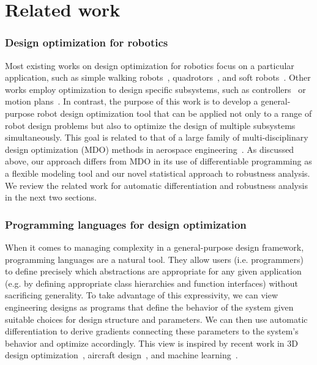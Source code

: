 \section{Related work}\label{ch:rss:related_work}

\subsubsection{Design optimization for robotics}

Most existing works on design optimization for robotics focus on a particular application, such as simple walking robots~\cite{Schulz_robogami}, quadrotors~\cite{du2016computational}, and soft robots~\cite{soft_robot_optimization_review,du2021underwater,ma2021diffaqua}. Other works employ optimization to design specific subsystems, such as controllers~\cite{xu_uav_controllers} or motion plans~\cite{schulmanMotionPlanningSequential2014}.
In contrast, the purpose of this work is to develop a general-purpose robot design optimization tool that can be applied not only to a range of robot design problems but also to optimize the design of multiple subsystems simultaneously. This goal is related to that of a large family of multi-disciplinary design optimization (MDO) methods in aerospace engineering~\cite{Martins2013_mdo_survey}. As discussed above, our approach differs from MDO in its use of differentiable programming as a flexible modeling tool and our novel statistical approach to robustness analysis. We review the related work for automatic differentiation and robustness analysis in the next two sections.

\subsubsection{Programming languages for design optimization}

When it comes to managing complexity in a general-purpose design framework, programming languages are a natural tool. They allow users (i.e. programmers) to define precisely which abstractions are appropriate for any given application (e.g. by defining appropriate class hierarchies and function interfaces) without sacrificing generality. To take advantage of this expressivity, we can view engineering designs as programs that define the behavior of the system given suitable choices for design structure and parameters. We can then use automatic differentiation to derive gradients connecting these parameters to the system's behavior and optimize accordingly. This view is inspired by recent work in 3D design optimization~\cite{cascaval2021differentiable}, aircraft design~\cite{sharpe_thesis}, and machine learning~\cite{pytorch,jax2018github}.

